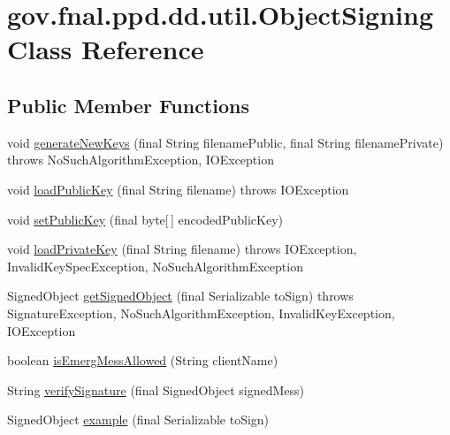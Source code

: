 \hypertarget{classgov_1_1fnal_1_1ppd_1_1dd_1_1util_1_1ObjectSigning}{\section{gov.\-fnal.\-ppd.\-dd.\-util.\-Object\-Signing Class Reference}
\label{classgov_1_1fnal_1_1ppd_1_1dd_1_1util_1_1ObjectSigning}
}
\subsection*{Public Member Functions}
\begin{DoxyCompactItemize}
\item 
void \hyperlink{classgov_1_1fnal_1_1ppd_1_1dd_1_1util_1_1ObjectSigning_afef17fffa3e013d7d7ec8fee9fe0f2ed}{generate\-New\-Keys} (final String filename\-Public, final String filename\-Private)  throws No\-Such\-Algorithm\-Exception, 			\-I\-O\-Exception 
\item 
void \hyperlink{classgov_1_1fnal_1_1ppd_1_1dd_1_1util_1_1ObjectSigning_a2df2836d06a9ef91552a6db2ebbf87e6}{load\-Public\-Key} (final String filename)  throws I\-O\-Exception 
\item 
void \hyperlink{classgov_1_1fnal_1_1ppd_1_1dd_1_1util_1_1ObjectSigning_acf35be23ecc6a1591a840068631b5b9e}{set\-Public\-Key} (final byte\mbox{[}$\,$\mbox{]} encoded\-Public\-Key)
\item 
void \hyperlink{classgov_1_1fnal_1_1ppd_1_1dd_1_1util_1_1ObjectSigning_a32b516e45d9436ce11bd5d34f4e92df1}{load\-Private\-Key} (final String filename)  throws I\-O\-Exception, Invalid\-Key\-Spec\-Exception, No\-Such\-Algorithm\-Exception 
\item 
Signed\-Object \hyperlink{classgov_1_1fnal_1_1ppd_1_1dd_1_1util_1_1ObjectSigning_a48cb87cad1109a678fb523ba9f14796d}{get\-Signed\-Object} (final Serializable to\-Sign)  throws Signature\-Exception, No\-Such\-Algorithm\-Exception, 			\-Invalid\-Key\-Exception, I\-O\-Exception 
\item 
boolean \hyperlink{classgov_1_1fnal_1_1ppd_1_1dd_1_1util_1_1ObjectSigning_a790a4a0aa418fe54e68a1322a48474cb}{is\-Emerg\-Mess\-Allowed} (String client\-Name)
\item 
String \hyperlink{classgov_1_1fnal_1_1ppd_1_1dd_1_1util_1_1ObjectSigning_a885ae8c325f4509babcda28d0b3019fb}{verify\-Signature} (final Signed\-Object signed\-Mess)
\item 
Signed\-Object \hyperlink{classgov_1_1fnal_1_1ppd_1_1dd_1_1util_1_1ObjectSigning_a9057227b05218ec23f3d91bb35dfda59}{example} (final Serializable to\-Sign)
\end{DoxyCompactItemize}
